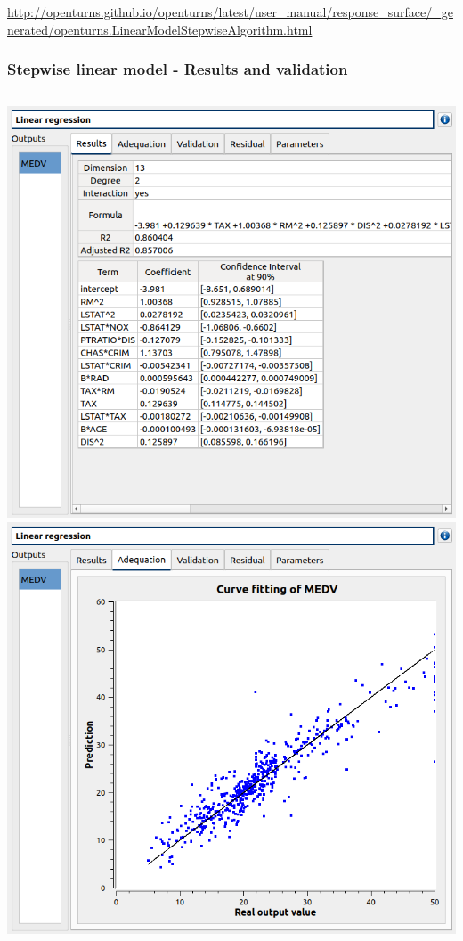 \documentclass[aspectratio=169]{beamer}
\begin{document}
\begin{frame}
\begin{columns}
  \end{columns}
  \begin{center}
    \vfill
    \tiny{\url{http://openturns.github.io/openturns/latest/user_manual/response_surface/_generated/openturns.LinearModelStepwiseAlgorithm.html}}
  \end{center}
\end{frame}


\begin{frame}
  \frametitle{Stepwise linear model - Results and validation}

  \begin{columns}

    \begin{center}
      \includegraphics[width=\textwidth]{figures/linearModel3.png}
      \includegraphics[width=\textwidth]{figures/linearModel4.png}

\end{center}
\end{columns}
\end{frame}
\end{document}
